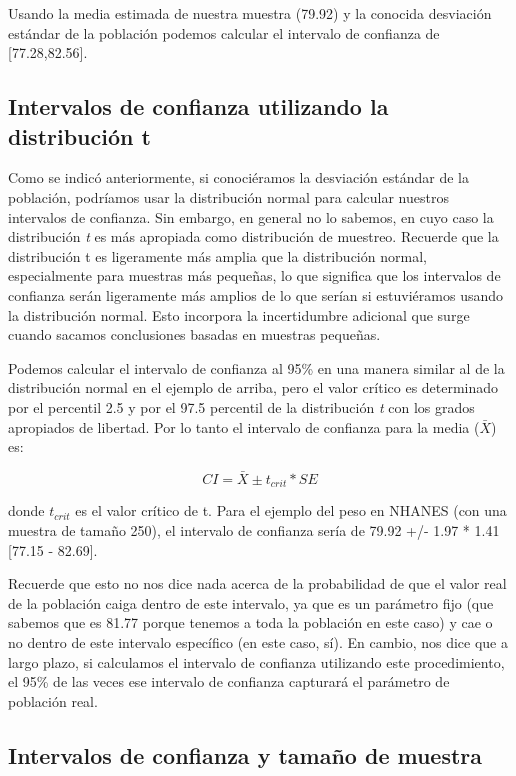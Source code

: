 \documentclass[
  12pt,
]{book}
\begin{document}
Usando la media estimada de nuestra muestra (79.92) y la conocida desviación estándar de la población podemos calcular el intervalo de confianza de {[}77.28,82.56{]}.

\hypertarget{intervalos-de-confianza-utilizando-la-distribuciuxf3n-t}{%
\subsection{Intervalos de confianza utilizando la distribución t}\label{intervalos-de-confianza-utilizando-la-distribuciuxf3n-t}}

Como se indicó anteriormente, si conociéramos la desviación estándar de la población, podríamos usar la distribución normal para calcular nuestros intervalos de confianza. Sin embargo, en general no lo sabemos, en cuyo caso la distribución \emph{t} es más apropiada como distribución de muestreo. Recuerde que la distribución t es ligeramente más amplia que la distribución normal, especialmente para muestras más pequeñas, lo que significa que los intervalos de confianza serán ligeramente más amplios de lo que serían si estuviéramos usando la distribución normal. Esto incorpora la incertidumbre adicional que surge cuando sacamos conclusiones basadas en muestras pequeñas.

Podemos calcular el intervalo de confianza al 95\% en una manera similar al de la distribución normal en el ejemplo de arriba, pero el valor crítico es determinado por el percentil 2.5 y por el 97.5 percentil de la distribución \emph{t} con los grados apropiados de libertad. Por lo tanto el intervalo de confianza para la media (\(\bar{X}\)) es:

\[
CI = \bar{X} \pm t_{crit}*SE
\]

donde \(t_{crit}\) es el valor crítico de t.
Para el ejemplo del peso en NHANES (con una muestra de tamaño 250), el intervalo de confianza sería de 79.92 +/- 1.97 * 1.41 {[}77.15 - 82.69{]}.

Recuerde que esto no nos dice nada acerca de la probabilidad de que el valor real de la población caiga dentro de este intervalo, ya que es un parámetro fijo (que sabemos que es 81.77 porque tenemos a toda la población en este caso) y cae o no dentro de este intervalo específico (en este caso, sí). En cambio, nos dice que a largo plazo, si calculamos el intervalo de confianza utilizando este procedimiento, el 95\% de las veces ese intervalo de confianza capturará el parámetro de población real.

\hypertarget{intervalos-de-confianza-y-tamauxf1o-de-muestra}{%
\subsection{Intervalos de confianza y tamaño de muestra}\label{intervalos-de-confianza-y-tamauxf1o-de-muestra}}
\end{document}
